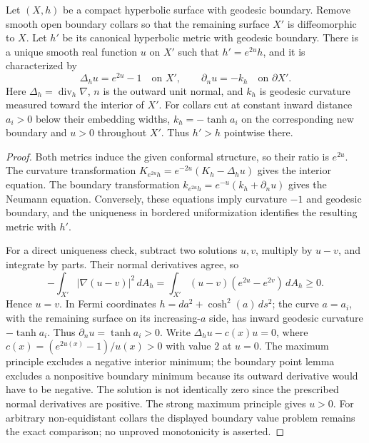 \begin{proposition}\label{A:collar}
Let $(X,h)$ be a compact hyperbolic surface with geodesic boundary.
Remove smooth open boundary collars so that the remaining surface
$X'$ is diffeomorphic to $X$. Let $h'$ be its canonical hyperbolic
metric with geodesic boundary. There is a unique smooth real
function $u$ on $X'$ such that $h'=e^{2u}h$, and it is characterized
by
\[
 \Delta_hu=e^{2u}-1\quad\text{on }X',\qquad
 \partial_{n}u=-k_h\quad\text{on }\partial X'.
\]
Here $\Delta_h=\operatorname{div}_h\nabla$, $n$ is the outward unit
normal, and $k_h$ is geodesic curvature measured toward the interior
of $X'$. For collars cut at constant inward distance $a_i>0$ below
their embedding widths, $k_h=-\tanh a_i$ on the corresponding new
boundary and $u>0$ throughout $X'$. Thus $h'>h$ pointwise there.
\end{proposition}
\begin{proof}
Both metrics induce the given conformal structure, so their ratio
is $e^{2u}$. The curvature transformation
$K_{e^{2u}h}=e^{-2u}(K_h-\Delta_hu)$ gives the interior equation.
The boundary transformation
$k_{e^{2u}h}=e^{-u}(k_h+\partial_nu)$ gives the Neumann equation.
Conversely, these equations imply curvature $-1$ and geodesic
boundary, and the uniqueness in bordered uniformization identifies
the resulting metric with $h'$.

For a direct uniqueness check, subtract two solutions $u,v$,
multiply by $u-v$, and integrate by parts. Their normal derivatives
agree, so
\[
 -\int_{X'}|\nabla(u-v)|^2\,dA_h
 =\int_{X'}(u-v)(e^{2u}-e^{2v})\,dA_h\geq0.
\]
Hence $u=v$. In Fermi coordinates $h=da^2+\cosh^2(a)\,ds^2$;
the curve $a=a_i$, with the remaining surface on its increasing-$a$
side, has inward geodesic curvature $-\tanh a_i$.
Thus $\partial_nu=\tanh a_i>0$. Write
$\Delta_hu-c(x)u=0$, where
$c(x)=(e^{2u(x)}-1)/u(x)>0$ with value $2$ at $u=0$.
The maximum principle excludes a negative interior minimum;
the boundary point lemma excludes a nonpositive boundary minimum
because its outward derivative would have to be negative.
The solution is not identically zero since the prescribed normal
derivatives are positive. The strong maximum principle gives
$u>0$. For arbitrary non-equidistant collars the displayed boundary
value problem remains the exact comparison; no unproved monotonicity
is asserted.
\end{proof}



